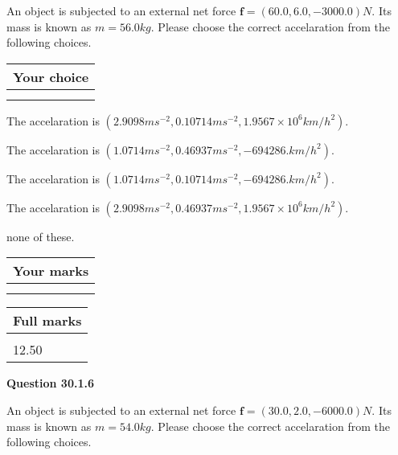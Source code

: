 \documentclass[12pt]{article}
\begin{document}
  
 
An object is subjected to an external net force $\mathbf{f}=(
60.0 ,
6.0,
-3000.0  )N$. Its mass is known as
$m= %
56.0  kg$. Please choose the correct accelaration
from the following choices.
 
  
  
\noindent\hspace{3.0in} \begin{tabular}{|l|}
\hline
Your choice \\
\hline
 \\ 
 \\ 
\hline
\end{tabular}
  
  
 
 
The accelaration is
$(
2.9098ms^{-2},
0.10714ms^{-2},
1.9567 \times 10^{6}km/h^2
).
$
 
 
The accelaration is
$(
1.0714ms^{-2},
0.46937ms^{-2},
-694286.km/h^2
).
$
 
 
The accelaration is
$(
1.0714ms^{-2},
0.10714ms^{-2},
-694286.km/h^2
).
$
 
 
The accelaration is
$(
2.9098ms^{-2},
0.46937ms^{-2},
1.9567 \times 10^{6}km/h^2
).
$
 
 
none of these.
 
 
 
 

 
\vspace{0.3in}
  
\vspace{0.2in}
  
         \begin{tabular}{|l|}
\hline
 Your marks  \\
\hline
 \\ 
 \\ 
\hline
\end{tabular}
\hspace{0.05in} \begin{tabular}{|l|}
\hline
 Full marks  \\
\hline
 \\ 
12.50 \\
\hline
\end{tabular}
{\textbf{\Large{Question
30.1.6 
}}}
  
  
 
An object is subjected to an external net force $\mathbf{f}=(
30.0 ,
2.0,
-6000.0  )N$. Its mass is known as
$m= %
54.0  kg$. Please choose the correct accelaration
from the following choices.
 
\end{document}
